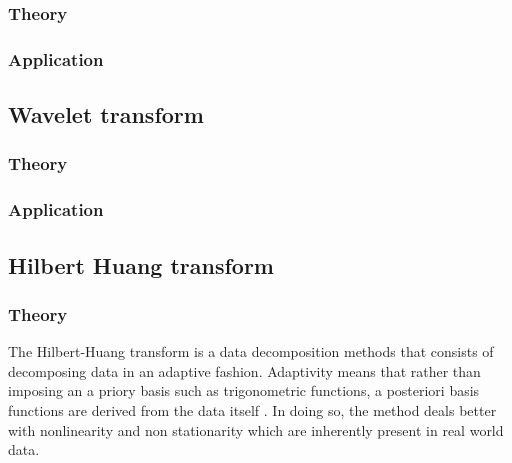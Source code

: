 \documentclass[11pt, oneside]{article}   	%
\begin{document}
\subsubsection{Theory}
\subsubsection{Application}



\subsection{Wavelet transform}
\subsubsection{Theory}
\subsubsection{Application}



\subsection{Hilbert Huang transform}
\subsubsection{Theory}
The Hilbert-Huang transform is a data decomposition methods that consists of decomposing data in an adaptive fashion. Adaptivity means that rather than imposing an a priory basis such as trigonometric functions, a posteriori basis functions are derived from the data itself \cite{norden2008}. In doing so, the method deals better with nonlinearity and non stationarity which are inherently present in real world data.
\end{document}
